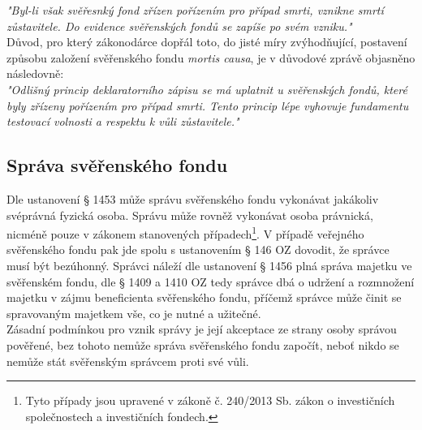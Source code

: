 \documentclass{article}
\begin{document}
\textit{"Byl-li však svěřesnký fond zřízen pořízením pro případ smrti, vznikne smrtí zůstavitele. Do evidence svěřenských fondů se zapíše po svém vzniku."}\\

Důvod, pro který zákonodárce dopřál toto, do jisté míry zvýhodňující, postavení způsobu založení svěřenského fondu \textit{mortis causa}, je v důvodové zprávě objasněno následovně:\\

\textit{"Odlišný princip deklaratorního zápisu se má uplatnit u svěřenských fondů, které byly zřízeny pořízením pro případ smrti. Tento princip lépe vyhovuje fundamentu testovací volnosti a respektu k vůli zůstavitele."}

\subsection{Správa svěřenského fondu}

Dle ustanovení § 1453 může správu svěřenského fondu vykonávat jakákoliv svéprávná fyzická osoba. Správu může rovněž vykonávat osoba právnická, nicméně pouze v zákonem stanovených případech\footnote{Tyto případy jsou upravené v zákoně č. 240/2013 Sb. zákon o investičních společnostech a investičních fondech.}. V případě veřejného svěřenského fondu pak jde spolu s ustanovením § 146 OZ dovodit, že správce musí být bezúhonný. Správci náleží dle ustanovení § 1456 plná správa majetku ve svěřenském fondu, dle § 1409 a 1410 OZ tedy správce dbá o udržení a rozmnožení majetku v zájmu beneficienta svěřenského fondu, příčemž správce může činit se spravovaným majetkem vše, co je nutné a užitečné.\\

Zásadní podmínkou pro vznik správy je její akceptace ze strany osoby správou pověřené, bez tohoto nemůže správa svěřenského fondu započít, neboť nikdo se nemůže stát svěřenským správcem proti své vůli.\\
\end{document}
